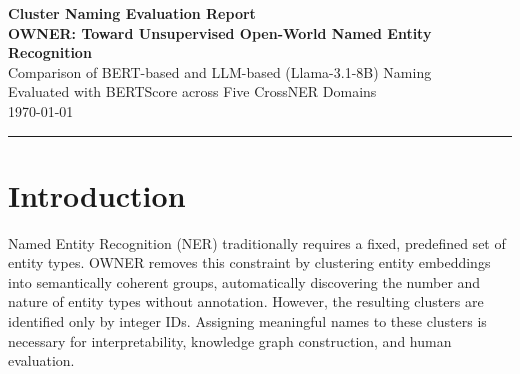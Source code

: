\documentclass[11pt,a4paper]{article}
\begin{document}
\begin{center}
  {\LARGE\bfseries\color{ownerblue}
    Cluster Naming Evaluation Report\\[0.4em]
    \large OWNER: Toward Unsupervised Open-World Named Entity Recognition}\\[1em]
  {\large Comparison of BERT-based and LLM-based (Llama-3.1-8B) Naming\\
  Evaluated with BERTScore across Five CrossNER Domains}\\[0.8em]
  {\small \today}
\end{center}
\vspace{0.5em}
\hrule
\vspace{1.5em}

\begin{abstract}
OWNER~\cite{genest2025owner} organises extracted entities into clusters
whose integer IDs carry no semantic meaning.
This report evaluates two automatic cluster-naming strategies proposed in the
paper: (1)~\textbf{BERT-based naming}, which predicts the most frequent
\texttt{[MASK]} token across all entities in a cluster, and
(2)~\textbf{LLM-based naming} (Llama-3.1-8B via Ollama), which infers a type
label from a sample of $n{=}16$ entities using the Figure~3 prompt.
Named clusters are scored against ground-truth entity type labels using
\textbf{BERTScore} (RoBERTa-large backbone) across five CrossNER domains:
AI, Literature, Music, Politics, and Science.
BERT naming achieves an average F$_1$ of \textbf{0.966} while LLM naming
achieves \textbf{0.944}, with BERT performing consistently better except
on the Music domain where both methods are within 0.001 F$_1$ of each other.
\end{abstract}

\section{Introduction}

Named Entity Recognition (NER) traditionally requires a fixed, predefined
set of entity types. OWNER removes this constraint by clustering entity
embeddings into semantically coherent groups, automatically discovering the
number and nature of entity types without annotation. However, the resulting
clusters are identified only by integer IDs. Assigning meaningful names to
these clusters is necessary for interpretability, knowledge graph construction,
and human evaluation.
\end{document}
